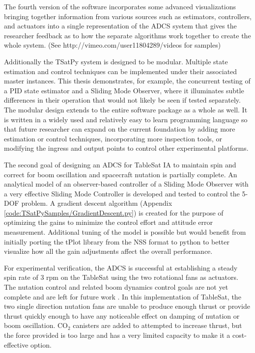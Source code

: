 The fourth version of the software incorporates some advanced visualizations bringing together information from various sources such as estimators, controllers, and actuators into a single representation of the ADCS system that gives the researcher feedback as to how the separate algorithms work together to create the whole system. (See http://vimeo.com/user11804289/videos for samples)

Additionally the TSatPy system is designed to be modular.  Multiple state estimation and control techniques can be implemented under their associated master instances.  This thesis demonstrates, for example, the concurrent testing of a PID state estimator and a Sliding Mode Observer, where it illuminates subtle differences in their operation that would not likely be seen if tested separately.  The modular design extends to the entire software package as a whole as well.  It is written in a widely used and relatively easy to learn programming language so that future researcher can expand on the current foundation by adding more estimation or control techniques, incorporating more inspection tools, or modifying the ingress and output points to control other experimental platforms.

The second goal of designing an ADCS for TableSat IA to maintain spin and correct for boom oscillation and spacecraft nutation is partially complete.  An analytical model of an observer-based controller of a Sliding Mode Observer with a very effective Sliding Mode Controller is developed and tested to control the 5-DOF problem.  A gradient descent algorithm (Appendix \ref{code:TSatPySamples/GradientDescent.py}) is created for the purpose of optimizing the gains to minimize the control effort and attitude error measurement.  Additional tuning of the model is possible but would benefit from initially porting the tPlot library from the NSS format to python to better visualize how all the gain adjustments affect the overall performance.

For experimental verification, the ADCS is successful at establishing a steady spin rate of 3 rpm on the TableSat using the two rotational fans as actuators.  The nutation control and related boom dynamics control goals are not yet complete and are left for future work .  In this implementation of TableSat, the two single direction nutation fans are unable to produce enough thrust or provide thrust quickly enough to have any noticeable effect on damping of nutation or boom oscillation.  $\text{CO}_2$ canisters are added to attempted to increase thrust, but the force provided is too large and has a very limited capacity to make it a cost-effective option.

